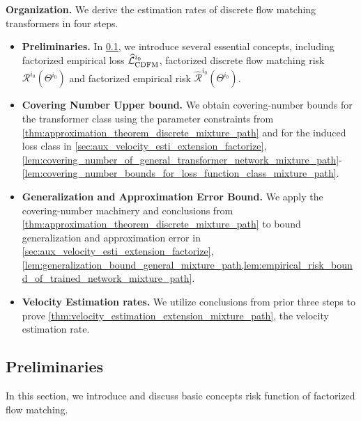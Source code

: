 \documentclass[12pt]{article}
\numberwithin{equation}{section}
\let\hat\widehat
\newcommand{\wh}{\widehat}
\renewcommand{\hat}{\wh}
\theoremstyle{theoremstyle}
\numberwithin{equation}{section}
\numberwithin{theorem}{section}
\numberwithin{proposition}{section}
\numberwithin{definition}{section}
\numberwithin{lemma}{section}
\numberwithin{assumption}{section}
\numberwithin{remark}{section}
\begin{document}
\textbf{Organization.} 
We derive the estimation rates of discrete flow matching transformers in four steps.
\begin{itemize}
\item \textbf{Preliminaries.}
In \cref{subsec:velocity_estimation_mixture_path_preliminary}, we introduce several essential concepts, including factorized empirical loss $\hat{\mathcal{L}}^{i_0}_{\rm CDFM}$, factorized discrete flow matching risk $\mathcal{R}^{i_0}(\Theta^{i_0})$ and factorized empirical risk $\hat{\mathcal{R}}^{i_0}(\Theta^{i_0})$.

\item \textbf{Covering Number Upper bound.}
We obtain covering-number bounds for the transformer class using the parameter constraints from \cref{thm:approximation_theorem_discrete_mixture_path} and for the induced loss class in \cref{sec:aux_velocity_esti_extension_factorize}, \cref{lem:covering_number_of_general_transformer_network_mixture_path}-\cref{lem:covering_number_bounds_for_loss_function_class_mixture_path}.

\item \textbf{Generalization and Approximation Error Bound.}
We apply the covering-number machinery and conclusions from \cref{thm:approximation_theorem_discrete_mixture_path} to bound generalization and approximation error in \cref{sec:aux_velocity_esti_extension_factorize}, \cref{lem:generalization_bound_general_mixture_path,lem:empirical_risk_bound_of_trained_network_mixture_path}.

\item  \textbf{Velocity Estimation rates.}
We utilize conclusions from prior three steps to prove \cref{thm:velocity_estimation_extension_mixture_path}, the velocity estimation rate.
\end{itemize}

\subsection{Preliminaries}\label{subsec:velocity_estimation_mixture_path_preliminary}
In this section, we introduce and discuss basic concepts risk function of factorized flow matching.
\end{document}
